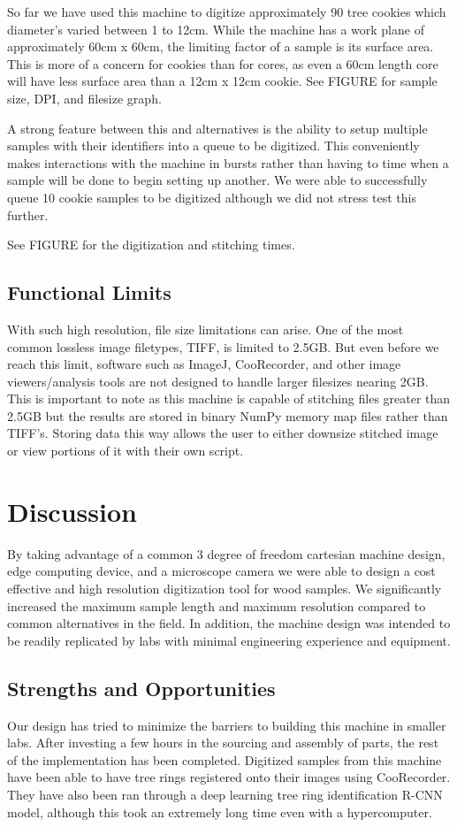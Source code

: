 \documentclass[a4paper,12pt]{article}
\begin{document}
So far we have used this machine to digitize approximately 90 tree cookies which diameter's varied between 1 to 12cm.
While the machine has a work plane of approximately 60cm x 60cm, the limiting factor of a sample is its surface area. 
This is more of a concern for cookies than for cores, as even a 60cm length core will have less surface area than a 12cm x 12cm cookie. 
See FIGURE for sample size, DPI, and filesize graph. 

A strong feature between this and alternatives is the ability to setup multiple samples with their identifiers into a queue to be digitized. 
This conveniently makes interactions with the machine in bursts rather than having to time when a sample will be done to begin setting up another. 
We were able to successfully queue 10 cookie samples to be digitized although we did not stress test this further. 

See FIGURE for the digitization and stitching times. 

\subsection{Functional Limits}
With such high resolution, file size limitations can arise. One of the most common lossless image filetypes, TIFF, is limited to 2.5GB.
But even before we reach this limit, software such as ImageJ, CooRecorder, and other image viewers/analysis tools are not designed to handle larger filesizes nearing 2GB.
This is important to note as this machine is capable of stitching files greater than 2.5GB but the results are stored in binary NumPy memory map files rather than TIFF's. 
Storing data this way allows the user to either downsize stitched image or view portions of it with their own script. 

\section{Discussion}
By taking advantage of a common 3 degree of freedom cartesian machine design, edge computing device, and a microscope camera we were able to design a cost effective and high resolution digitization tool for wood samples. 
We significantly increased the maximum sample length and maximum resolution compared to common alternatives in the field. 
In addition, the machine design was intended to be readily replicated by labs with minimal engineering experience and equipment. 

\subsection{Strengths and Opportunities}
Our design has tried to minimize the barriers to building this machine in smaller labs. After investing a few hours in the sourcing and assembly of parts, 
the rest of the implementation has been completed. Digitized samples from this machine have been able to have tree rings registered onto their images using CooRecorder.
They have also been ran through a deep learning tree ring identification R-CNN model, although this took an extremely long time even with a hypercomputer.
\end{document}
